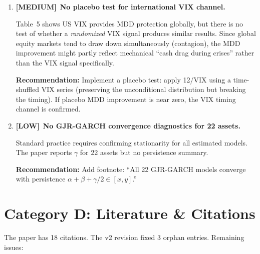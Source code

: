\documentclass[12pt,a4paper]{article}
\newcommand{\MEDIUM}{\textcolor{medsev}{\textbf{[MEDIUM]}}}
\newcommand{\LOW}{\textcolor{lowsev}{\textbf{[LOW]}}}
\begin{document}
\begin{enumerate}[label=\textbf{C.\arabic*}]
\textbf{Recommendation:} Add a one-sentence footnote: ``An expanding-window orthogonalization yields qualitatively identical results (available upon request).''


\item \MEDIUM\ \textbf{No placebo test for international VIX channel.}

Table~5 shows US VIX provides MDD protection globally, but there is no test of whether a \textit{randomized} VIX signal produces similar results. Since global equity markets tend to draw down simultaneously (contagion), the MDD improvement might partly reflect mechanical ``cash drag during crises'' rather than the VIX signal specifically.

\textbf{Recommendation:} Implement a placebo test: apply 12/VIX using a time-shuffled VIX series (preserving the unconditional distribution but breaking the timing). If placebo MDD improvement is near zero, the VIX timing channel is confirmed.


\item \LOW\ \textbf{No GJR-GARCH convergence diagnostics for 22 assets.}

Standard practice requires confirming stationarity for all estimated models. The paper reports $\gamma$ for 22 assets but no persistence summary.

\textbf{Recommendation:} Add footnote: ``All 22 GJR-GARCH models converge with persistence $\alpha + \beta + \gamma/2 \in [x, y]$.''

\end{enumerate}


\section{Category D: Literature \& Citations}
\label{sec:citations}

The paper has 18 citations. The v2 revision fixed 3 orphan entries. Remaining issues:
\end{document}
